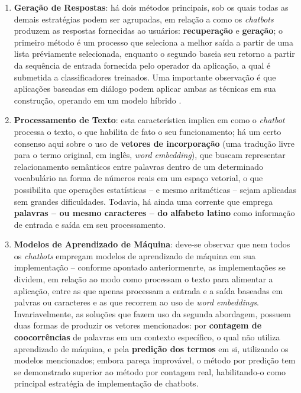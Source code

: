 \begin{enumerate}
    \item \textbf{Geração de Respostas}: há dois métodos principais, sob os quais todas as demais estratégias podem ser agrupadas, em relação a como os \textit{chatbots} produzem as respostas fornecidas ao usuários: \textbf{recuperação} e \textbf{geração}; o primeiro método é um processo que seleciona a melhor saída a partir de uma lista préviamente selecionada, enquanto o segundo baseia seu retorno a partir da sequência de entrada fornecida pelo operador da aplicação, a qual é submetida a classificadores treinados. Uma importante observação é que aplicações baseadas em diálogo podem aplicar ambas as técnicas em sua construção, operando em um modelo híbrido \cite{lokman2018modern}.
    \item \textbf{Processamento de Texto}: esta característica implica em como o \textit{chatbot} processa o texto, o que habilita de fato o seu funcionamento; há um certo consenso aqui sobre o uso de \textbf{vetores de incorporação} (uma tradução livre para o termo original, em inglês, \textit{word embedding}), que buscam representar relacionamento semânticos entre palavras dentro de um determinado vocabulário na forma de números reais em um espaço vetorial, o que possibilita que operações estatísticas -- e mesmo aritméticas -- sejam aplicadas sem grandes dificuldades. Todavia, há ainda uma corrente que emprega \textbf{palavras -- ou mesmo caracteres -- do alfabeto latino} como informação de entrada e saída em seu processamento.
    \item \textbf{Modelos de Aprendizado de Máquina}: deve-se observar que nem todos os \textit{chatbots} empregam modelos de aprendizado de máquina em sua implementação -- conforme apontado anteriormenrte, as implementações se dividem, em relação ao modo como processam o texto para alimentar a aplicação, entre as que apenas processam a entrada e a saída baseadas em palvras ou caracteres e as que recorrem ao uso de \textit{word embeddings}. Invariavelmente, as soluções que fazem uso da segunda abordagem, possuem duas formas de produzir os vetores mencionados: por \textbf{contagem de coocorrências} de palavras em um contexto específico, o qual não utiliza aprendizado de máquina, e pela \textbf{predição dos termos} em si, utilizando os modelos mencionados; embora pareça improvável, o método por predição tem se demonstrado superior ao método por contagem real, habilitando-o como principal estratégia de implementação de chatbots.
\end{enumerate}


